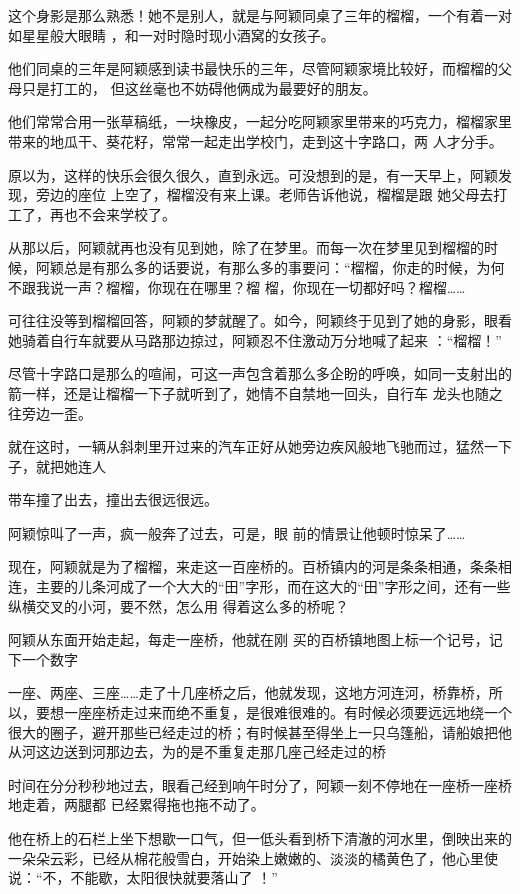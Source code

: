 \documentclass{article}
\begin{document}
这个身影是那么熟悉！她不是别人，就是与阿颖同桌了三年的榴榴，一个有着一对如星星般大眼睛
，和一对时隐时现小酒窝的女孩子。 

他们同桌的三年是阿颖感到读书最快乐的三年，尽管阿颖家境比较好，而榴榴的父母只是打工的，
但这丝毫也不妨碍他俩成为最要好的朋友。 

他们常常合用一张草稿纸，一块橡皮，一起分吃阿颖家里带来的巧克力，榴榴家里带来的地瓜干、葵花籽，常常一起走出学校门，走到这十字路口，两
人才分手。 

原以为，这样的快乐会很久很久，直到永远。可没想到的是，有一天早上，阿颖发现，旁边的座位
\newpage
上空了，榴榴没有来上课。老师告诉他说，榴榴是跟
她父母去打工了，再也不会来学校了。 

从那以后，阿颖就再也没有见到她，除了在梦里。而每一次在梦里见到榴榴的时候，阿颖总是有那么多的话要说，有那么多的事要问：“榴榴，你走的时候，为何不跟我说一声？榴榴，你现在在哪里？榴
榴，你现在一切都好吗？榴榴…… 

可往往没等到榴榴回答，阿颖的梦就醒了。如今，阿颖终于见到了她的身影，眼看她骑着自行车就要从马路那边掠过，阿颖忍不住激动万分地喊了起来
：“榴榴！” 

尽管十字路口是那么的喧闹，可这一声包含着那么多企盼的呼唤，如同一支射出的箭一样，还是让榴榴一下子就听到了，她情不自禁地一回头，自行车
龙头也随之往旁边一歪。 

就在这时，一辆从斜刺里开过来的汽车正好从她旁边疾风般地飞驰而过，猛然一下子，就把她连人
\newpage

带车撞了出去，撞出去很远很远。 

阿颖惊叫了一声，疯一般奔了过去，可是，眼
前的情景让他顿时惊呆了…… 

现在，阿颖就是为了榴榴，来走这一百座桥的。百桥镇内的河是条条相通，条条相连，主要的儿条河成了一个大大的“田”字形，而在这大的“田”字形之间，还有一些纵横交叉的小河，要不然，怎么用
得着这么多的桥呢？ 

阿颖从东面开始走起，每走一座桥，他就在刚
买的百桥镇地图上标一个记号，记下一个数字 

一座、两座、三座……走了十几座桥之后，他就发现，这地方河连河，桥靠桥，所以，要想一座座桥走过来而绝不重复，是很难很难的。有时候必须要远远地绕一个很大的圈子，避开那些已经走过的桥；有时候甚至得坐上一只乌篷船，请船娘把他从河这边送到河那边去，为的是不重复走那几座己经走过的桥

\newpage

时间在分分秒秒地过去，眼看己经到响午时分了，阿颖一刻不停地在一座桥一座桥地走着，两腿都
已经累得拖也拖不动了。 

他在桥上的石栏上坐下想歇一口气，但一低头看到桥下清澈的河水里，倒映出来的一朵朵云彩，已经从棉花般雪白，开始染上嫩嫩的、淡淡的橘黄色了，他心里使说：“不，不能歇，太阳很快就要落山了
！” 
\end{document}
